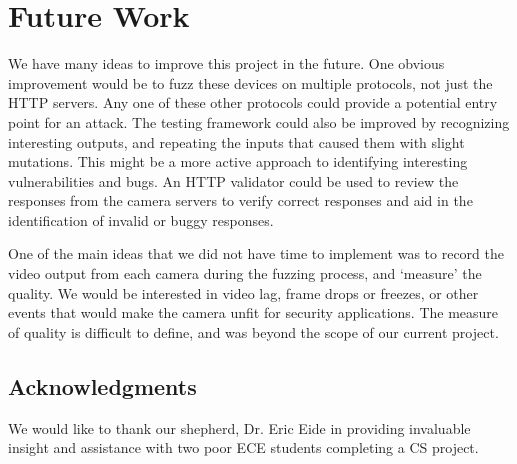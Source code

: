 \documentclass[letterpaper,twocolumn,10pt]{article}
\begin{document}
\section{Future Work}
We have many ideas to improve this project in the future. One obvious improvement would be to fuzz these devices on multiple protocols, not just the HTTP servers. Any one of these other protocols could provide a potential entry point for an attack. The testing framework could also be improved by recognizing interesting outputs, and repeating the inputs that caused them with slight mutations. This might be a more active approach to identifying interesting vulnerabilities and bugs. An HTTP validator could be used to review the responses from the camera servers to verify correct responses and aid in the identification of invalid or buggy responses. 

One of the main ideas that we did not have time to implement was to record the video output from each camera during the fuzzing process, and `measure' the quality. We would be interested in video lag, frame drops or freezes, or other events that would make the camera unfit for security applications. The measure of quality is difficult to define, and was beyond the scope of our current project. 






\subsection*{Acknowledgments}
We would like to thank our shepherd, Dr. Eric Eide in providing invaluable insight and assistance with two poor ECE students completing a CS project.

{\footnotesize 
}
\end{document}
